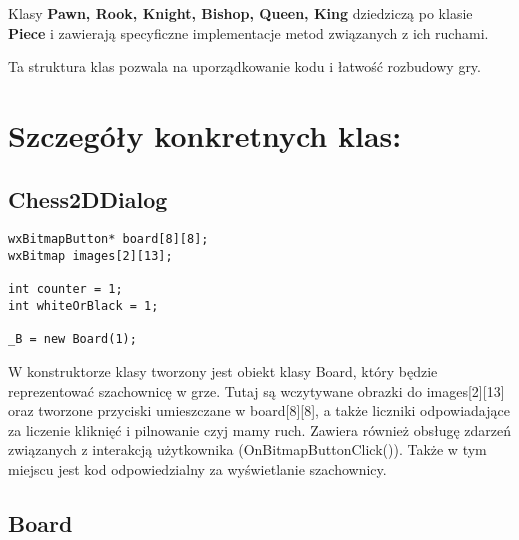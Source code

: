 \documentclass[]{report}
\begin{document}
Klasy \textbf{Pawn, Rook, Knight, Bishop, Queen, King} dziedziczą po klasie \textbf{Piece} i zawierają specyficzne implementacje metod związanych z ich ruchami.
\begin{flushleft}
Ta struktura klas pozwala na uporządkowanie kodu i łatwość rozbudowy gry.
\end{flushleft}
\section*{Szczegóły konkretnych klas:}

\subsection*{Chess2DDialog}

\begin{lstlisting}
wxBitmapButton* board[8][8];
wxBitmap images[2][13];

int counter = 1;
int whiteOrBlack = 1;

_B = new Board(1);

\end{lstlisting}
\begin{flushleft}
W konstruktorze klasy tworzony jest obiekt klasy Board, który będzie reprezentować szachownicę w grze. Tutaj są wczytywane obrazki do images[2][13] oraz tworzone przyciski umieszczane w board[8][8], a także liczniki odpowiadające za liczenie kliknięć i pilnowanie czyj mamy ruch. Zawiera również obsługę zdarzeń związanych z interakcją użytkownika (OnBitmapButtonClick()). Także w tym miejscu jest kod odpowiedzialny za wyświetlanie szachownicy.
\end{flushleft}
\subsection*{Board}
\end{document}
